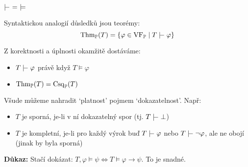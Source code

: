 \documentclass{beamer}
\begin{document}
\begin{frame}{$\proves\ =\ \models$}

    Syntaktickou analogií \alert{důsledků} jsou \alert{teorémy}:
    $$\Thm_\mathbb P(T)=\{\varphi\in\VF_\mathbb P\mid T\proves\varphi\}$$
    
    Z korektnosti a úplnosti okamžitě dostáváme:
        \begin{itemize}
            \item $T\proves\varphi$ právě když $T\models\varphi$
            \item $\operatorname{Thm}_\mathbb P(T)=\operatorname{Csq}_\mathbb P(T)$
        \end{itemize}
    
    Všude můžeme nahradit `\alert{platnost}' pojmem `\alert{dokazatelnost}'.  Např:
    \begin{itemize}
        \item $T$ je \alert{sporná}, je-li v ní dokazatelný spor (tj. \alert{$T\proves\bot$})
        \item $T$ je \alert{kompletní}, je-li pro každý výrok buď $T\proves\varphi$ nebo $T\proves\neg\varphi$, ale ne obojí (jinak by byla sporná)
    \end{itemize}


    \textbf{Důkaz:} Stačí dokázat: $T,\varphi\models\psi\Leftrightarrow T\models\varphi\to\psi$. To je snadné.\hfill\qedsymbol

\end{frame}
\end{document}
